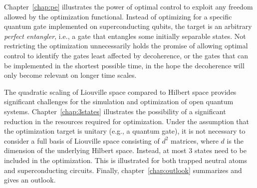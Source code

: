 Chapter~\ref{chap:pe} illustrates the power of optimal control to exploit
any freedom allowed by the optimization functional. Instead of optimizing for
a specific quantum gate implemented on superconducting qubits, the target is an
arbitrary \emph{perfect entangler}, i.e., a gate that entangles some initially
separable states. Not restricting the optimization unnecessarily holds the
promise of allowing optimal control to identify the gates least affected by
decoherence, or the gates that can be implemented in the shortest possible time,
in the hope the decoherence will only become relevant on longer time scales.

The quadratic scaling of Liouville space compared to Hilbert space provides
significant challenges for the simulation and optimization of open quantum
systems. Chapter~\ref{chap:3states} illustrates the possibility of a significant
reduction in the resources required for optimization. Under the assumption that
the optimization target is unitary (e.g., a quantum gate), it is not necessary
to consider a full basis of Liouville space consisting of $d^2$ matrices, where
$d$ is the dimension of the underlying Hilbert space. Instead, at most 3 states
need to be included in the optimization. This is illustrated for both trapped
neutral atoms and superconducting circuits.
Finally, chapter~\ref{chap:outlook} summarizes and gives an outlook.

